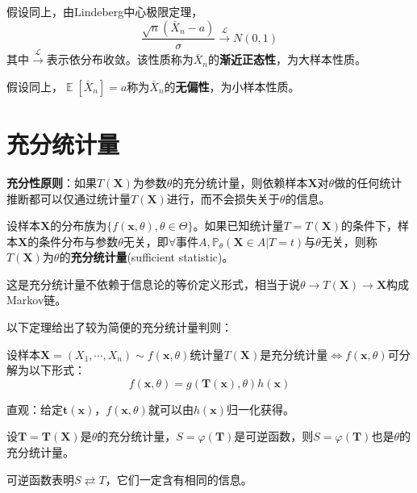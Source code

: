\documentclass{ctexbook}
\DeclareMathOperator{\E}{\mathbb{E}}     %
\begin{document}
\begin{example}
    假设同上，由Lindeberg中心极限定理，
    $$\frac{\sqrt{n}(\bar{X}_n-a)}{\sigma}\xrightarrow{\mathcal{L} }N(0,1)$$
    其中$\xrightarrow{\mathcal{L} }$表示依分布收敛。该性质称为$\bar{X}_n$的\textbf{渐近正态性}，为大样本性质。
\end{example}

\begin{example}
    假设同上，$\E[\bar{X}_n]=a$称为$\bar{X}_n$的\textbf{无偏性}，为小样本性质。
\end{example}

\section{充分统计量}

\textbf{充分性原则}：如果$T(\mathbf{X})$为参数$\theta$的充分统计量，则依赖样本$\mathbf{X}$对$\theta$做的任何统计推断都可以仅通过统计量$T(\mathbf{X})$进行，而不会损失关于$\theta$的信息。

\begin{definition}[充分统计量]
    设样本$\mathbf{X}$的分布族为$\{f(\mathbf{x},\theta),\theta\in\Theta\}$。如果已知统计量$T=T(\mathbf{X})$的条件下，样本$\mathbf{X}$的条件分布与参数$\theta$无关，即$\forall\text{事件}A,\mathbb{P}_{\theta}(\mathbf{X}\in A|T=t)$与$\theta$无关，则称$T(\mathbf{X})$为$\theta$的\textbf{充分统计量}(sufficient statistic)。
\end{definition}
\begin{remark}
    这是充分统计量不依赖于信息论的等价定义形式，相当于说$\theta\to T(\mathbf{X})\to\mathbf{X}$构成Markov链。
\end{remark}

以下定理给出了较为简便的充分统计量判则：
\begin{theorem}[因子分解定理]
    设样本$\mathbf{X}=(X_1,\cdots,X_n)\sim f(\mathbf{x},\theta)$统计量$T(\mathbf{X})$是充分统计量$\iff f(\mathbf{x},\theta)$可分解为以下形式：
    $$f(\mathbf{x},\theta)=g(\mathbf{T(x)},\theta)h(\mathbf{x})$$
\end{theorem}
直观：给定$\mathbf{t(x)}$，$f(\mathbf{x},\theta)$就可以由$h(\mathbf{x})$归一化获得。

\begin{corollary}
    设$\mathbf{T}=\mathbf{T}(\mathbf{X})$是$\theta$的充分统计量，$S=\varphi(\mathbf{T})$是可逆函数，则$S=\varphi(\mathbf{T})$也是$\theta$的充分统计量。
\end{corollary}
可逆函数表明$S\rightleftarrows T$，它们一定含有相同的信息。
\end{document}
